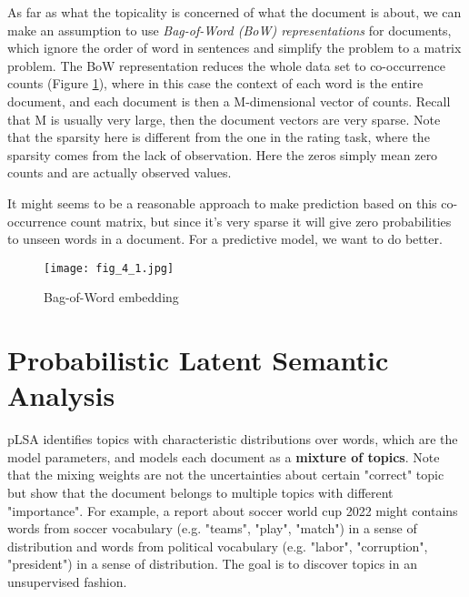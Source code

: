 \documentclass[../book-template.tex]{subfiles}
\begin{document}
\par As far as what the topicality is concerned of what the document is about, we can make an assumption to use \emph{Bag-of-Word (BoW) representations} for documents, which ignore the order of word in sentences and simplify the problem to a matrix problem. The BoW representation reduces the whole data set to co-occurrence counts (Figure \ref{fig_4_1}), where in this case the context of each word is the entire document, and each document is then a M-dimensional vector of counts. Recall that M is usually very large, then the document vectors are very sparse. Note that the sparsity here is different from the one in the rating task, where the sparsity comes from the lack of observation. Here the zeros simply mean zero counts and are actually observed values.
\par It might seems to be a reasonable approach to make prediction based on this co-occurrence count matrix, but since it's very sparse it will give zero probabilities to unseen words in a document. For a predictive model, we want to do better.
\begin{figure}[h] 
	\centering 
	\texttt{[image: fig\_4\_1.jpg]} 
	\caption{Bag-of-Word embedding}\label{fig_4_1}
\end{figure}
\section{Probabilistic Latent Semantic Analysis}
pLSA identifies topics with characteristic distributions over words, which are the model parameters, and models each document as a \textbf{mixture of topics}. Note that the mixing weights are not the uncertainties about certain "correct" topic but show that the document belongs to multiple topics with different "importance". For example, a report about soccer world cup 2022 might contains words from soccer vocabulary (e.g. "teams", "play", "match") in a sense of distribution and words from political vocabulary (e.g. "labor", "corruption", "president") in a sense of distribution. The goal is to discover topics in an unsupervised fashion.
\end{document}
